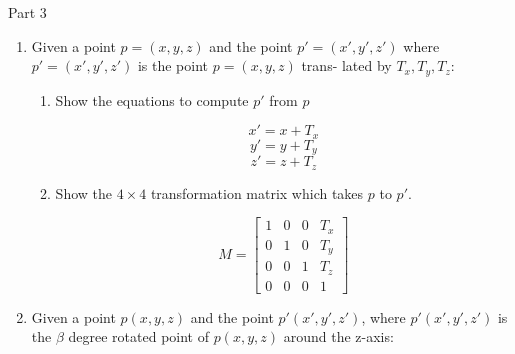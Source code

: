 \documentclass{article}
\begin{document}
    {\large Part 3}
    \begin{enumerate}
        \item Given a point $p = (x, y, z)$ and the point $p' = (x', y', z')$ where $p' = (x', y', z')$ is the point $p = (x, y, z)$ trans-
            lated by $T_x, T_y, T_z$:

            \begin{enumerate}
                \item Show the equations to compute $p'$ from $p$
                    \begin{mdframed}
                        \begin{displaymath}
                            x' = x + T_x
                        \end{displaymath}
                        \begin{displaymath}
                            y' = y + T_y
                        \end{displaymath}
                        \begin{displaymath}
                            z' = z + T_z
                        \end{displaymath}
                    \end{mdframed}
                \item Show the $4\times 4$ transformation matrix which takes
                    $p$ to $p'$.
                    \begin{mdframed}
                        \begin{displaymath}
                            M =
                            \begin{bmatrix}
                                1 & 0 & 0 & T_x\\ 
                                0 & 1 & 0 & T_y\\
                                0 & 0 & 1 & T_z\\
                                0 & 0 & 0 & 1 
                            \end{bmatrix}
                        \end{displaymath}
                    \end{mdframed}
            \end{enumerate}
            \break
        \item Given a point $p(x, y, z)$ and the point $p'(x', y', z')$, where $p'(x', y', z')$ is the $\beta$ degree rotated point
            of $p(x, y, z)$ around the z-axis:


\end{enumerate}
\end{document}
